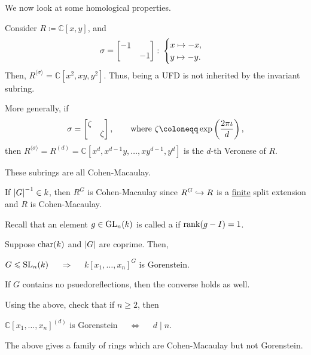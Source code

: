 \documentclass[12pt]{article}
\begin{document}
We now look at some homological properties.

\begin{ex}
	Consider $R \coloneqq \mathbb{C}[x, y]$, and
	\begin{equation*} 
		\sigma = \begin{bmatrix} -1 &  \\  & -1 \end{bmatrix} \colon 
		\begin{cases}
			x \mapsto -x, \\
			y \mapsto -y.
		\end{cases}
	\end{equation*}
	Then, $R^{\langle \sigma \rangle} = \mathbb{C}[x^{2}, xy, y^{2}]$. Thus, being a UFD is not inherited by the invariant subring. 

	More generally, if 
	\begin{equation*} 
		\sigma = \two{\zeta}{}{}{\zeta}, \qquad \text{where } \zeta \coloneqq \exp\left(\dfrac{2 \pi \iota}{d}\right),
	\end{equation*}	
	then $R^{\langle \sigma \rangle} = R^{(d)} = \mathbb{C}[x^{d}, x^{d - 1} y, \ldots, x y^{d - 1}, y^{d}]$ is the $d$-th Veronese of $R$.

	These subrings are all Cohen-Macaulay.
\end{ex}

\begin{rem}
	If ${\left\lvert G \right\lvert}^{-1} \in k$, then $R^{G}$ is Cohen-Macaulay since $R^{G} \hookrightarrow R$ is a \underline{finite} split extension and $R$ is Cohen-Macaulay. \newline
\end{rem}

Recall that an element $g \in \operatorname{GL}_{n}(k)$ is called a  if $\operatorname{rank}(g - I) = 1$.

\begin{thm}[Watanabe]
	Suppose $\operatorname{char}(k)$ and ${\left\lvert G \right\lvert}$ are coprime. Then,
	\begin{center}
		$G \leqslant \operatorname{SL}_{n}(k)$ $\quad\Rightarrow\quad$ $k[x_{1}, \ldots, x_{n}]^{G}$ is Gorenstein.
	\end{center}
	If $G$ contains no psuedoreflections, then the converse holds as well.
\end{thm}

\begin{exe}
	Using the above, check that if $n \ge 2$, then
	\begin{center} 
		$\mathbb{C}[x_{1}, \ldots, x_{n}]^{(d)}$ is Gorenstein $\quad\Leftrightarrow\quad$ $d \mid n$.
	\end{center}
	The above gives a family of rings which are Cohen-Macaulay but not Gorenstein.
\end{exe}
\end{document}
